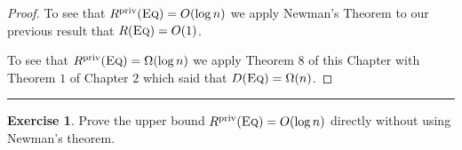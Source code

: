 \documentclass[11pt]{amsart}
\theoremstyle{plain}
\theoremstyle{definition}
\newtheorem{exercise}{Exercise}
\theoremstyle{plain}
\newcommand{\Eq}{\textsc{Eq}}
\newcommand{\Rpriv}{R^{\mathrm{priv}}}
\newcommand{\exercises}{\bigskip \noindent\rule{8cm}{0.4pt} \medskip}
\begin{document}
\begin{proof}
To see that $\Rpriv(\Eq) = O(\log n)$ we apply Newman's Theorem to our previous result that $R(\Eq) = O(1)$.

To see that $\Rpriv(\Eq) = \Omega(\log n)$ we apply Theorem 8 of this Chapter with Theorem $1$ of Chapter $2$ which said that $D(\Eq) = \Omega(n)$.
\end{proof}

\exercises

\begin{exercise}
Prove the upper bound $\Rpriv(\Eq) = O( \log n)$ directly without using Newman's theorem.
\end{exercise}
\end{document}
